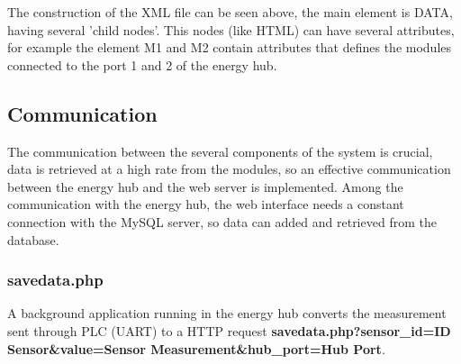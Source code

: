 The construction of the XML file can be seen above, the main element is DATA, having several 'child nodes'. This nodes (like HTML) can have several attributes, for example the element M1 and M2 contain attributes that defines the modules connected to the port 1 and 2 of the energy hub.

\subsection{Communication}
The communication between the several components of the system is crucial, data is retrieved at a high rate from the modules, so an effective communication between the energy hub and the web server is implemented. Among the communication with the energy hub, the web interface needs a constant connection with the MySQL server, so data can added and retrieved from the database.

\subsubsection{savedata.php}
A background application running in the energy hub converts the measurement sent through PLC (UART) to a HTTP request \textbf{savedata.php?sensor\_id=ID Sensor\&value=Sensor Measurement\&hub\_port=Hub Port}.

